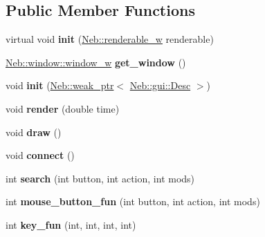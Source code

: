 \subsection*{\-Public \-Member \-Functions}
\begin{DoxyCompactItemize}
\item 
\hypertarget{classNeb_1_1gui_1_1layout_ad6fa086f64518d422b16f810f83f0250}{virtual void {\bfseries init} (\hyperlink{classNeb_1_1weak__ptr}{\-Neb\-::renderable\-\_\-w} renderable)}\label{classNeb_1_1gui_1_1layout_ad6fa086f64518d422b16f810f83f0250}

\item 
\hypertarget{classNeb_1_1gui_1_1layout_a37cb12d529360e0d15dae6caa8100b55}{\hyperlink{classNeb_1_1weak__ptr}{\-Neb\-::window\-::window\-\_\-w} {\bfseries get\-\_\-window} ()}\label{classNeb_1_1gui_1_1layout_a37cb12d529360e0d15dae6caa8100b55}

\item 
\hypertarget{classNeb_1_1gui_1_1layout_af415dbb46b787503ce59ea2633a120d5}{void {\bfseries init} (\hyperlink{classNeb_1_1weak__ptr}{\-Neb\-::weak\-\_\-ptr}$<$ \hyperlink{classNeb_1_1gui_1_1Desc}{\-Neb\-::gui\-::\-Desc} $>$)}\label{classNeb_1_1gui_1_1layout_af415dbb46b787503ce59ea2633a120d5}

\item 
\hypertarget{classNeb_1_1gui_1_1layout_a36e5373962c69242b86849fa32f01d62}{void {\bfseries render} (double time)}\label{classNeb_1_1gui_1_1layout_a36e5373962c69242b86849fa32f01d62}

\item 
\hypertarget{classNeb_1_1gui_1_1layout_af8e1c6e8812556b7b6d378b54c2e543a}{void {\bfseries draw} ()}\label{classNeb_1_1gui_1_1layout_af8e1c6e8812556b7b6d378b54c2e543a}

\item 
\hypertarget{classNeb_1_1gui_1_1layout_aa3ed6f6dcce6fa855fe21b5981ae3675}{void {\bfseries connect} ()}\label{classNeb_1_1gui_1_1layout_aa3ed6f6dcce6fa855fe21b5981ae3675}

\item 
\hypertarget{classNeb_1_1gui_1_1layout_a4c18c667db6f8785235b5a00267271e0}{int {\bfseries search} (int button, int action, int mods)}\label{classNeb_1_1gui_1_1layout_a4c18c667db6f8785235b5a00267271e0}

\item 
\hypertarget{classNeb_1_1gui_1_1layout_ae7b46224022698da37e6c211133655b2}{int {\bfseries mouse\-\_\-button\-\_\-fun} (int button, int action, int mods)}\label{classNeb_1_1gui_1_1layout_ae7b46224022698da37e6c211133655b2}

\item 
\hypertarget{classNeb_1_1gui_1_1layout_a8cfe092a0929ec0298b62dc47f9caf96}{int {\bfseries key\-\_\-fun} (int, int, int, int)}\label{classNeb_1_1gui_1_1layout_a8cfe092a0929ec0298b62dc47f9caf96}

\end{DoxyCompactItemize}
